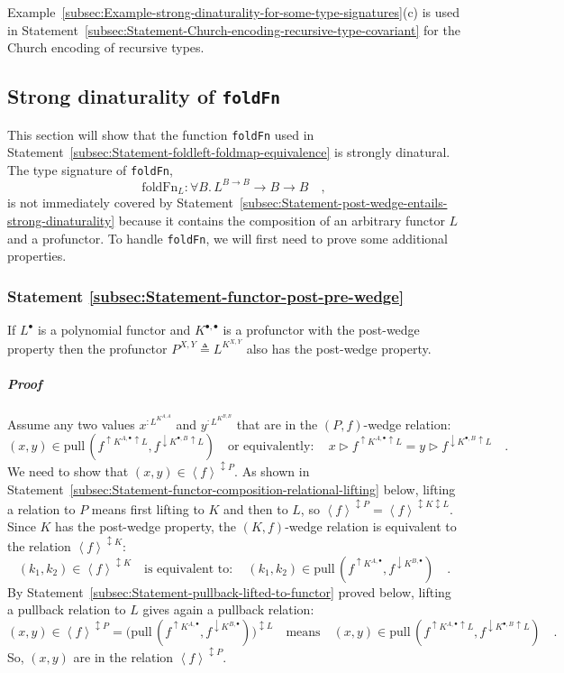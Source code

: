 Example~\ref{subsec:Example-strong-dinaturality-for-some-type-signatures}(c)
is used in Statement~\ref{subsec:Statement-Church-encoding-recursive-type-covariant}
for the Church encoding of recursive types.

\subsection{Strong dinaturality of \texttt{foldFn}}

This section will show that the function \lstinline!foldFn! used
in Statement~\ref{subsec:Statement-foldleft-foldmap-equivalence}
is strongly dinatural. The type signature of \lstinline!foldFn!,
\[
\text{foldFn}_{L}:\forall B.\,L^{B\rightarrow B}\rightarrow B\rightarrow B\quad,
\]
is not immediately covered by Statement~\ref{subsec:Statement-post-wedge-entails-strong-dinaturality}
because it contains the composition of an arbitrary functor $L$ and
a profunctor. To handle \lstinline!foldFn!, we will first need to
prove some additional properties.

\subsubsection{Statement \label{subsec:Statement-functor-post-pre-wedge}\ref{subsec:Statement-functor-post-pre-wedge}}

If $L^{\bullet}$ is a polynomial functor and $K^{\bullet,\bullet}$
is a profunctor with the post-wedge property then the profunctor $P^{X,Y}\triangleq L^{K^{X,Y}}$
also has the post-wedge property.

\subparagraph{Proof}

Assume any two values $x^{:L^{K^{A,A}}}$ and $y^{:L^{K^{B,B}}}$
that are in the $\left(P,f\right)$-wedge relation:
\[
(x,y)\in\text{pull}\,(f^{\uparrow K^{A,\bullet}\uparrow L},f^{\downarrow K^{\bullet,B}\uparrow L})\quad\text{or equivalently}:\quad x\triangleright f^{\uparrow K^{A,\bullet}\uparrow L}=y\triangleright f^{\downarrow K^{\bullet,B}\uparrow L}\quad.
\]
We need to show that $\left(x,y\right)\in\left<f\right>^{\updownarrow P}$.
As shown in Statement~\ref{subsec:Statement-functor-composition-relational-lifting}
below, lifting a relation to $P$ means first lifting to $K$ and
then to $L$, so $\left<f\right>^{\updownarrow P}=\left<f\right>^{\updownarrow K\updownarrow L}$.
Since $K$ has the post-wedge property, the $\left(K,f\right)$-wedge
relation is equivalent to the relation $\left<f\right>^{\updownarrow K}$:
\[
(k_{1},k_{2})\in\left<f\right>^{\updownarrow K}\quad\text{is equivalent to}:\quad(k_{1},k_{2})\in\text{pull}\,(f^{\uparrow K^{A,\bullet}},f^{\downarrow K^{B,\bullet}})\quad.
\]
By Statement~\ref{subsec:Statement-pullback-lifted-to-functor} proved
below, lifting a pullback relation to $L$ gives again a pullback
relation:
\[
\left(x,y\right)\in\left<f\right>^{\updownarrow P}=\big(\text{pull}\,(f^{\uparrow K^{A,\bullet}},f^{\downarrow K^{B,\bullet}})\big)^{\updownarrow L}\quad\text{means}\quad(x,y)\in\text{pull}\,(f^{\uparrow K^{A,\bullet}\uparrow L},f^{\downarrow K^{\bullet,B}\uparrow L})\quad.
\]
So, $\left(x,y\right)$ are in the relation $\left<f\right>^{\updownarrow P}$.

